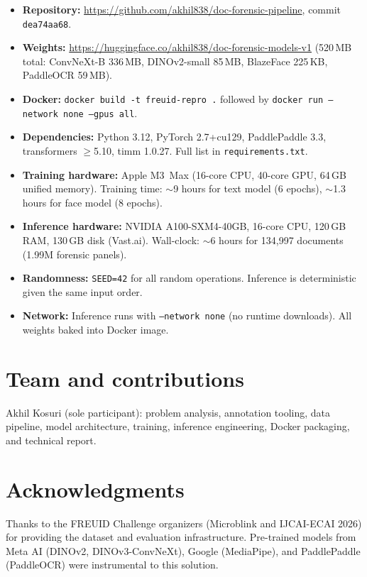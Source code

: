 \documentclass[11pt,a4paper]{article}
\begin{document}
\begin{itemize}[noitemsep]
  \item \textbf{Repository:} \url{https://github.com/akhil838/doc-forensic-pipeline},
        commit \texttt{dea74aa68}.
  \item \textbf{Weights:} \url{https://huggingface.co/akhil838/doc-forensic-models-v1}
        (520\,MB total: ConvNeXt-B 336\,MB, DINOv2-small 85\,MB, BlazeFace 225\,KB,
        PaddleOCR 59\,MB).
  \item \textbf{Docker:} \texttt{docker build -t freuid-repro .}
        followed by \texttt{docker run --network none --gpus all}.
  \item \textbf{Dependencies:} Python 3.12, PyTorch 2.7+cu129, PaddlePaddle 3.3,
        transformers $\geq$5.10, timm 1.0.27. Full list in \texttt{requirements.txt}.
  \item \textbf{Training hardware:} Apple M3~Max (16-core CPU, 40-core GPU,
        64\,GB unified memory). Training time: $\sim$9 hours for text model
        (6 epochs), $\sim$1.3 hours for face model (8 epochs).
  \item \textbf{Inference hardware:} NVIDIA A100-SXM4-40GB, 16-core CPU,
        120\,GB RAM, 130\,GB disk (Vast.ai).
        Wall-clock: $\sim$6 hours for 134{,}997 documents (1.99M forensic panels).
  \item \textbf{Randomness:} \texttt{SEED=42} for all random operations.
        Inference is deterministic given the same input order.
  \item \textbf{Network:} Inference runs with \texttt{--network none}
        (no runtime downloads). All weights baked into Docker image.
\end{itemize}

\section{Team and contributions}

Akhil Kosuri (sole participant): problem analysis, annotation tooling,
data pipeline, model architecture, training, inference engineering,
Docker packaging, and technical report.

\section*{Acknowledgments}

Thanks to the FREUID Challenge organizers (Microblink and IJCAI-ECAI 2026) for
providing the dataset and evaluation infrastructure.
Pre-trained models from Meta AI (DINOv2, DINOv3-ConvNeXt), Google (MediaPipe),
and PaddlePaddle (PaddleOCR) were instrumental to this solution.
\end{document}
